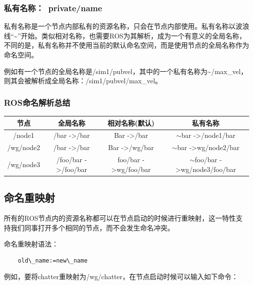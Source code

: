 \documentclass[9pt, oneside]{book}
\begin{document}
\subsubsection{私有名称：~private/name}

私有名称是一个节点内部私有的资源名称，只会在节点内部使用。私有名称以波浪线“\textasciitilde”开始。类似相对名称，也需要ROS为其解析，成为一个有意义的全局名称，不同的是，私有名称并不使用当前的默认命名空间，而是使用节点的全局名称作为命名空间。

例如有一个节点的全局名称是/sim1/pubvel，其中的一个私有名称为\textasciitilde/max\_vel，则其会被解析成全局名称：/sim1/pubvel/max\_vel。

\subsubsection{ROS命名解析总结}

\begin{table}[H]
    \begin{tabular}{c|c|c|c}
    \hline
    节点        & 全局名称                            & 相对名称(默认)                         & 私有名称                                         \\ \hline
    /node1    & /bar -\textgreater /bar         & Bar -\textgreater /bar           & $\sim$bar -\textgreater /node1/bar           \\ \hline
    /wg/node2 & /bar -\textgreater /bar         & Bar -\textgreater /wg/bar        & $\sim$bar -\textgreater wg/node2/bar         \\ \hline
    /wg/node3 & /foo/bar -\textgreater /foo/bar & foo/bar -\textgreater wg/foo/bar & $\sim$foo/bar -\textgreater wg/node3/foo/bar \\ \hline
    \end{tabular}
\end{table}

\subsection{命名重映射}

所有的ROS节点内的资源名称都可以在节点启动的时候进行重映射，这一特性支持我们同事打开多个相同的节点，而不会发生命名冲突。

命名重映射语法：

\begin{verbatim}
    old\_name:=new\_name
\end{verbatim}

例如，要将chatter重映射为/wg/chatter，在节点启动时候可以输入如下命令：
\end{document}
